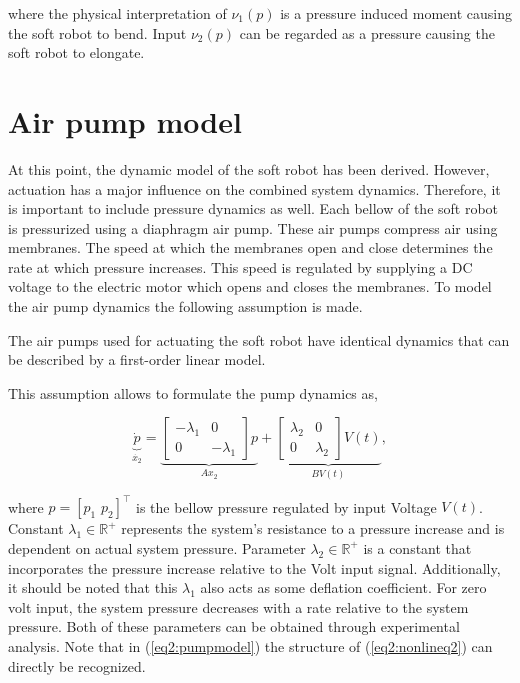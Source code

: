 {where the physical interpretation of $\nu_1(p)$ is a pressure induced moment causing the soft robot to bend. Input $\nu_2(p)$ can be regarded as a pressure causing the soft robot to elongate.



\section{Air pump model}


At this point, the dynamic model of the soft robot has been derived. However, actuation has a major influence on the combined system dynamics. Therefore, it is important to include pressure dynamics as well. Each bellow of the soft robot is pressurized using a diaphragm air pump. These air pumps compress air using membranes. The speed at which the membranes open and close determines the rate at which pressure increases. This speed is regulated by supplying a DC voltage to the electric motor which opens and closes the membranes. To model the air pump dynamics the following assumption is made.

\begin{theorem}
The air pumps used for actuating the soft robot have identical dynamics that can be described by a first-order linear model.
\end{theorem}

This assumption allows to formulate the pump dynamics as,

\begin{equation}
 \underbrace{\dot{p}}_{\dot{x_2}}  = \underbrace{\begin{bmatrix} -\lambda_1 & 0 \\ 0 & -\lambda_1 \end{bmatrix} p}_{Ax_2} + \underbrace{\begin{bmatrix} \lambda_2 & 0 \\ 0 & \lambda_2 \end{bmatrix} V(t)}_{BV(t)},
    \label{eq2:pumpmodel}
\end{equation}

where $p =  [p_1 \hspace{4pt} p_2]^\top$ is the bellow pressure regulated by input Voltage $V(t)$. Constant $\lambda_1 \in \mathbb{R}^+$ represents the system's resistance to a pressure increase and is dependent on actual system pressure. Parameter $\lambda_2 \in \mathbb{R}^+$ is a constant that incorporates the pressure increase relative to the Volt input signal. Additionally, it should be noted that this $\lambda_1$ also acts as some deflation coefficient. For zero volt input, the system pressure decreases with a rate relative to the system pressure. Both of these parameters can be obtained through experimental analysis. Note that in (\ref{eq2:pumpmodel}) the structure of (\ref{eq2:nonlineq2}) can directly be recognized. 







}
